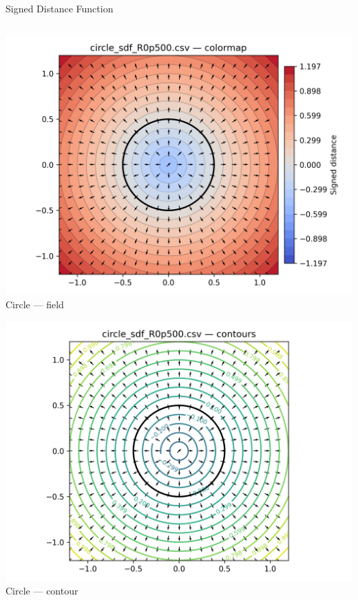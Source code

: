 \documentclass[10pt, aspectratio=169]{beamer}
\begin{document}
\begin{frame}{Signed Distance Function}
\begin{columns}[T,onlytextwidth]
\begin{column}{0.65\textwidth}
      \begin{minipage}{\linewidth}
        \begin{minipage}{0.5\linewidth}
          \centering
          \includegraphics[width=\linewidth]{Figures/circle_sdf_R0p500_cmap.png}\\[-0.2em]
          \scriptsize Circle — field
        \end{minipage}\hfill
        \begin{minipage}{0.5\linewidth}
          \centering
          \includegraphics[width=\linewidth]{Figures/circle_sdf_R0p500_contour.png}\\[-0.2em]
          \scriptsize Circle — contour
        \end{minipage}
      \end{minipage}
    \end{column}
  \end{columns}
\end{frame}
\end{document}
